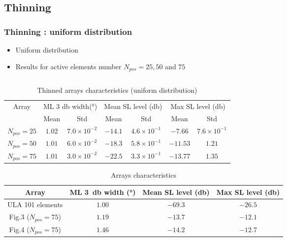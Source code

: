 \documentclass[UKenglish,8pt,aspectratio=1610]{beamer}
\begin{document}
	\subsection{Thinning}
	\begin{frame}
		\frametitle{Thinning : uniform distribution \cite{Optimization_of_sparse_arrays}}
		
		
		
		
		\begin{itemize}
			\item Uniform distribution
			\item Results for active elements number $N_{pos}=25,50$ and $75$ 
		\end{itemize} 

	\begin{columns}
	\begin{column}{0.7\textwidth}
			\begin{table}
			\begin{tabular}{ccccccc}
				\hline
				\multirow{2}{*}{Array} &
				\multicolumn{2}{c}{ML 3 \si{\decibel} width(\si{\degree})} &
				\multicolumn{2}{c}{Mean SL level (\si{\decibel})} &
				\multicolumn{2}{c}{Max SL level (\si{\decibel})} \\
				& {Mean} & {Std} & {Mean} & {Std} & {Mean} & {Std} \\
				\hline
				\hline
				$N_{pos}=25$ & $1.02$ & $7.0\times 10^{-2}$ & $-14.1$& $4.6\times 10^{-1}$ & $-7.66$ & $7.6\times 10^{-1}$ \\
				$N_{pos}=50$& $1.01$ & $6.0\times 10^{-2}$ & $-18.3$ & $5.8\times 10^{-1}$ & $-11.53 $& $1.21$\\
				$N_{pos}=75$& $1.01$ & $3.0\times 10^{-2}$ & $-22.5$ & $3.3\times 10^{-1}$ & $-13.77$ & $1.35 $\\
				\hline
			\end{tabular}
			\centering
			\caption{Thinned arrays characteristics (uniform distribution)}
		\end{table}
		
		\begin{table}
			\begin{tabular}{cccc}
				\hline
				Array&ML 3~\si{\decibel} width (\si{\degree})& Mean SL level (\si{\decibel})&Max SL level (\si{\decibel})\\
				\hline\hline
				ULA 101 elements&$1.00$&$ -69.3$ & $-26.5$ \\
				Fig.3 \cite{Optimization_of_sparse_arrays} ($N_{pos}=75$)& $1.19 $& $-13.7$ &$-12.1$\\
				Fig.4 \cite{Optimization_of_sparse_arrays} ($N_{pos}=75$)& $1.46$ & $-14.2$ &$-12.7$\\
					\hline
			\end{tabular}
			\centering
			\caption{Arrays characteristics}
		\end{table}
		

\end{column}
\end{columns}
\end{frame}
\end{document}
